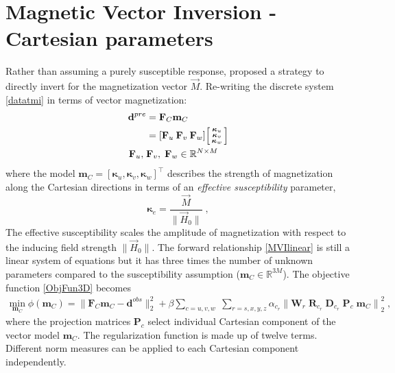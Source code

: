 \section{Magnetic Vector Inversion - Cartesian parameters}
Rather than assuming a purely susceptible response, \cite{LelievreOldenburg2009}
proposed a strategy to directly invert for the magnetization vector $\vec M$.
Re-writing the discrete system \eqref{datatmi} in terms of vector magnetization:
\begin{equation}\label{MVIlinear}
\begin{split}
\mathbf{d}^{pre} &= \mathbf{F}_{C} \mathbf{m}_C \\
&= [ \mathbf{F}_u \: \mathbf{F}_v \: \mathbf{F}_w]
\begin{bsmallmatrix}
\boldsymbol{\kappa}_{u}\\
\boldsymbol{\kappa}_{v}\\
\boldsymbol{\kappa}_{w}
\end{bsmallmatrix} \\
\mathbf{F}_u,\; &\mathbf{F}_v, \;\mathbf{F}_w \in \mathbb{R}^{N \times M}
\end{split}
\end{equation}
where the model $\mathbf{m}_C = [\boldsymbol{\kappa}_{u}, \boldsymbol{\kappa}_{v}, \boldsymbol{\kappa}_{w}]^\top$ describes the strength of magnetization along the Cartesian directions in terms of an \emph{effective susceptibility} parameter,
\begin{equation}
\boldsymbol{\kappa}_e = \frac{\vec M}{\|\vec H_0\|} \;,
\end{equation}
The effective susceptibility scales the amplitude of magnetization with respect to the inducing field strength $\|\vec {H}_0\|$.
The forward relationship \eqref{MVIlinear} is still a linear system of equations but it has three times the number of unknown parameters compared to the susceptibility assumption ($\mathbf{m}_C \in \mathbb{R}^{3M}$). The objective function \eqref{ObjFun3D} becomes
\begin{equation} \label{phi_m_sparse_3C}
\begin{split}
\underset{\mathbf{m}_C}{\text{min}}\; \phi(\mathbf{m}_C) = \|\mathbf{F}_{C} \mathbf{m}_C - \mathbf{d}^{obs}\|_2^2 + \beta \sum_{c = u,v,w} \;
\sum_{r = s,x,y,z} \alpha_{c_r} {\|\mathbf{W}_r \;\mathbf{R}_{c_r} \; \mathbf{D}_{c_r} \;\mathbf{P}_{c} \; \mathbf{m}_C\|}^2_2 \;,
\end{split}
\end{equation}
where the projection matrices $\mathbf{P}_{c}$ select individual Cartesian component of the vector model $\mathbf{m}_C$. The regularization function is made up of twelve terms. Different norm measures can be applied to each Cartesian component independently.

